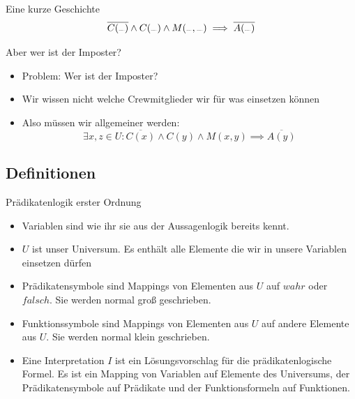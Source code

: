 \begin{frame}[fragile]{Eine kurze Geschichte}
	$$
		\overline{C(\sus{red})}\wedge C(\sus{white})\wedge M(\sus{red},\sus{white})\implies \overline{A(\sus{white})}
	$$
\end{frame}

\begin{frame}[fragile]{Aber wer ist der Imposter?}
	\begin{itemize}
		\item<1-> \alert{Problem:} Wer ist der Imposter?
		\item<2-> Wir wissen nicht welche Crewmitglieder wir für was einsetzen können
		\item<3-> Also müssen wir allgemeiner werden:
		      $$
			      \exists x,z \in U: \overline{C(x)}\wedge C(y)\wedge M(x,y)\implies \overline{A(y)}
		      $$
	\end{itemize}
	\begin{center}
	\end{center}
\end{frame}

\subsection{Definitionen}

\begin{frame}{Prädikatenlogik erster Ordnung}
	\begin{itemize}
		\item<1-> \alert{Variablen} sind wie ihr sie aus der Aussagenlogik bereits kennt.
		\item<2-> $U$ ist unser \alert{Universum}. Es enthält alle Elemente die wir in unsere Variablen einsetzen dürfen
		\item<3-> \alert{Prädikatensymbole} sind Mappings von Elementen aus $U$ auf $wahr$ oder $falsch$.
		      Sie werden normal groß geschrieben.
		\item<4-> \alert{Funktionssymbole} sind Mappings von Elementen aus $U$ auf andere Elemente aus $U$.
		      Sie werden normal klein geschrieben.
		\item<5> Eine \alert{Interpretation} $I$ ist ein Lösungsvorschlag für die prädikatenlogische Formel.
		      Es ist ein Mapping von Variablen auf Elemente des Universums, der Prädikatensymbole auf Prädikate und der Funktionsformeln auf Funktionen.
	\end{itemize}
\end{frame}

